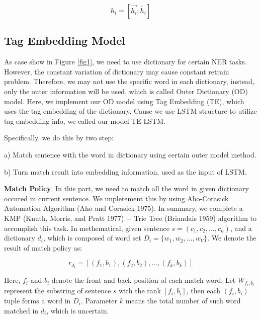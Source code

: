 \documentclass[letterpaper]{article} %
\begin{document}
\begin{equation}
h_i = [\overrightarrow{h_i};\overleftarrow{h_i}] \label{lstm_out}
\end{equation}

\subsection{Tag Embedding Model}

As case show in Figure \ref{fig1}, we need to use dictionary for certain NER tasks. However, the constant variation of dictionary may cause constant retrain problem. Therefore, we may not use the specific word in each dictionary, instead, only the outer information will be used, which is called Outer Dictionary (OD) model. Here, we implement our OD model using Tag Embedding (TE), which uses the tag embedding of the dictionary. Cause we use LSTM structure to utilize tag embedding info, we called our model  TE-LSTM.

Specifically, we do this by two step: 

a)  Match sentence with the word in dictionary using certain outer model method.

b)  Turn match result into embedding information, used as the input of LSTM.

\textbf{Match Policy}. In this part, we need to match all the word in given dictionary occured in current sentence. We impletement this by using Aho-Corasick Automation Algorithm (Aho and Corasick 1975). In summary, we complete a KMP (Knuth, Morris, and Pratt 1977) + Trie Tree (Briandais 1959) algorithm to accomplish this task. In methematical, given sentence $s = (c_1, c_2, ..., c_n) $, and a dictionary $d_i$, which is composed of word set $D_i=\{w_1, w_2, ..., w_V\}$. We denote the result of match policy as:

\begin{equation}
r_{d_i} = [ (f_1, b_1), (f_2 , b_2), ..., (f_k, b_k) ] \label{match_result}
\end{equation}

Here, $f_i$ and $b_i$ denote the front and back position of each match word. Let $W_{f_i,b_i}$ represent the substring of sentence $s$ with the rank $[f_i, b_i]$, then each $(f_i, b_i)$ tuple forms a word in $D_i$. Parameter $k$ means the total number of such word matched in $d_i$, which is uncertain.
\end{document}

